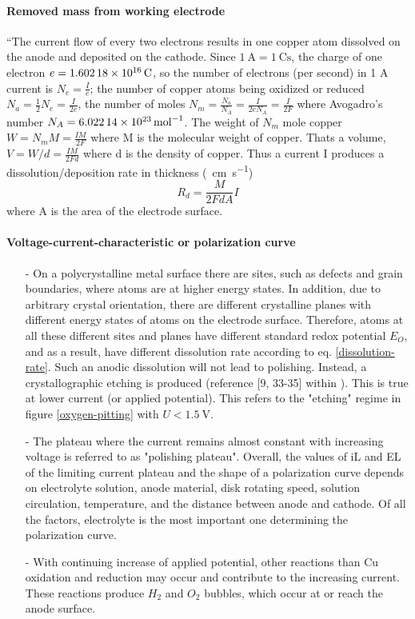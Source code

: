 \paragraph{Removed mass from working electrode}
``The current flow of every two electrons results in one copper atom dissolved on the anode and deposited on the cathode. Since $\SI{1}{\ampere}= \SI{1}{\coulomb \second}$, the charge of one electron $e = \SI{1.60218E16}{\coulomb}$, so the number of electrons (per second) in 1 A current is $N_e = \frac{I}{e}$; the number of copper atoms being oxidized or reduced $N_a= \frac{1}{2} N_e= \frac{I}{2e}$, the number of moles $N_m = \frac{N_a}{N_A} = \frac{I}{2eN_A}= \frac{I}{2F}$ where Avogadro's number $N_A = \SI{6.02214E23}{\per \mole}$. The weight of $N_m$ mole copper $W = N_m M = \frac{IM}{2 F}$ where M is the molecular weight of copper. Thats a volume, $V = W / d =\frac{IM}{2 F d}$ where d is the density of copper. Thus a current I produces a dissolution/deposition rate in thickness (\SI{}{\centi\meter \per \second}) \begin{equation} R_d=\frac{M}{2 FdA}I \label{dissolution-rate}\end{equation}
where A is the area of the electrode surface.
\cite[34]{jinshan_electrochemical_2004}

\paragraph{Voltage-current-characteristic or polarization curve}
\begin{itemize}
 \item[-]On a polycrystalline metal surface there are sites, such as defects and grain boundaries, where atoms are at higher energy states. In addition, due to arbitrary crystal orientation, there are different crystalline planes with different energy states of atoms on the electrode surface. Therefore, atoms at all these different sites and planes have different standard redox potential $E_O$, and as a result, have different dissolution rate according to eq. \ref{dissolution-rate}. Such an anodic dissolution will not lead to polishing. Instead, a crystallographic etching is produced (reference [9, 33-35] within \cite{jinshan_electrochemical_2004}). This is true at lower current (or applied potential). This refers to the "etching" regime in figure \ref{oxygen-pitting} with $U<\SI{1.5}{\volt}$.
 \item[-]The plateau where the current remains almost constant with increasing voltage is referred to as "polishing plateau". Overall, the values of iL and EL of the limiting current plateau and the shape of a polarization curve depends on electrolyte solution, anode material, disk rotating speed, solution circulation, temperature, and the distance between anode and cathode.
Of all the factors, electrolyte is the most important one determining the polarization curve.
 \item[-]With continuing increase of applied potential, other reactions than Cu oxidation and reduction may occur and contribute to the increasing current. These reactions produce $H_2$ and $O_2$ bubbles, which occur at or reach the anode surface.
\end{itemize}

